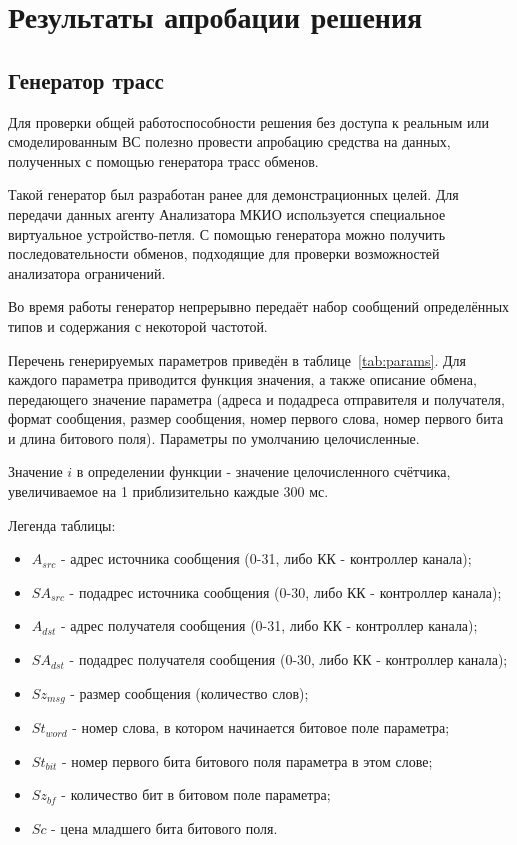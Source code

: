 \section{Результаты апробации решения}

\subsection{Генератор трасс}

Для проверки общей работоспособности решения без доступа к реальным 
или смоделированным ВС полезно провести апробацию средства на данных, 
полученных с помощью генератора трасс обменов.

Такой генератор был разработан ранее для демонстрационных целей. Для 
передачи данных агенту Анализатора МКИО используется специальное виртуальное 
устройство-петля. С помощью генератора можно получить последовательности 
обменов, подходящие для проверки возможностей анализатора ограничений.

Во время работы генератор непрерывно передаёт набор сообщений определённых 
типов и содержания с некоторой частотой. 

Перечень генерируемых параметров приведён в таблице~\ref{tab:params}. Для 
каждого параметра приводится функция значения, а также описание 
обмена, передающего значение параметра (адреса и подадреса отправителя и 
получателя, формат сообщения, размер сообщения, номер первого слова, номер 
первого бита и длина битового поля). Параметры по умолчанию целочисленные.

Значение $i$ в определении функции - значение целочисленного счётчика, 
увеличиваемое на 1 приблизительно каждые 300 мс.

Легенда таблицы:

\begin{itemize}
 \item $A_{src}$ - адрес источника сообщения (0-31, либо КК - контроллер 
канала);
 \item $SA_{src}$ - подадрес источника сообщения (0-30, либо КК - контроллер 
канала);
 \item $A_{dst}$ - адрес получателя сообщения (0-31, либо КК - контроллер 
канала);
 \item $SA_{dst}$ - подадрес получателя сообщения (0-30, либо КК - контроллер 
канала);
 \item $Sz_{msg}$ - размер сообщения (количество слов);
 \item $St_{word}$ - номер слова, в котором начинается битовое поле параметра;
 \item $St_{bit}$ - номер первого бита битового поля параметра в этом слове;
 \item $Sz_{bf}$ - количество бит в битовом поле параметра;
 \item $Sc$ - цена младшего бита битового поля.
\end{itemize}

